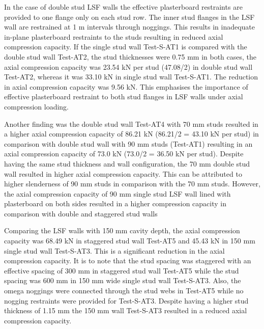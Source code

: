 In the case of double stud LSF walls the effective plasterboard restraints are provided to one flange only on each stud row. The inner stud flanges in the LSF wall are restrained at 1 m intervals through noggings. This results in inadequate in-plane plasterboard restraints to the studs resulting in reduced axial compression capacity. If the single stud wall Test-S-AT1 is compared with the double stud wall Test-AT2, the stud thicknesses were 0.75 mm in both cases, the axial compression capacity was 23.54 kN per stud (47.08/2) in double stud wall Test-AT2, whereas it was 33.10 kN in single stud wall Test-S-AT1. The reduction in axial compression capacity was 9.56 kN. This emphasises the importance of effective plasterboard restraint to both stud flanges in LSF walls under axial compression loading.

Another finding was the double stud wall Test-AT4 with 70 mm studs resulted in a higher axial compression capacity of 86.21 kN (86.21/2 = 43.10 kN per stud) in comparison with double stud wall with 90 mm studs (Test-AT1) resulting in an axial compression capacity of 73.0 kN (73.0/2 = 36.50 kN per stud). Despite having the same stud thickness and wall configuration, the 70 mm double stud wall resulted in higher axial compression capacity. This can be attributed to higher slenderness of 90 mm studs in comparison with the 70 mm studs. However, the axial compression capacity of 90 mm single stud LSF wall lined with plasterboard on both sides resulted in a higher compression capacity in comparison with double and staggered stud walls 

Comparing the LSF walls with 150 mm cavity depth, the axial compression capacity was 68.49 kN in staggered stud wall Test-AT5 and 45.43 kN in 150 mm single stud wall Test-S-AT3. This is a significant reduction in the axial compression capacity. It is to note that the stud spacing was staggered with an effective spacing of 300 mm in staggered stud wall Test-AT5 while the stud spacing was 600 mm in 150 mm wide single stud wall Test-S-AT3. Also, the omega noggings were connected through the stud webs in Test-AT5 while no nogging restraints were provided for Test-S-AT3. Despite having a higher stud thickness of 1.15 mm the 150 mm wall Test-S-AT3 resulted in a reduced axial compression capacity. 


